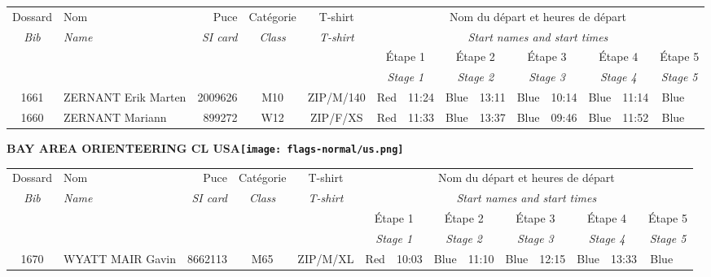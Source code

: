 \documentclass{report}
\begin{document}
  \begin{longtable}{|c|l|r|c|c|*{5}{cc|}}
    Dossard & Nom  & Puce    & Catégorie & T-shirt & \multicolumn{10}{c|}{Nom du départ et heures de départ} \\
    \itshape Bib     & \itshape Name & \itshape SI card & \itshape Class  & \itshape  T-shirt  & \multicolumn{10}{c|}{\itshape Start names and start times} \\
    \hline
    & & & & & \multicolumn{2}{c|}{Étape 1} & \multicolumn{2}{c|}{Étape 2} & \multicolumn{2}{c|}{Étape 3} & \multicolumn{2}{c|}{Étape 4} & \multicolumn{2}{c|}{Étape 5} \\
    & & & & & \multicolumn{2}{c|}{\itshape Stage 1} & \multicolumn{2}{c|}{\itshape Stage 2} & \multicolumn{2}{c|}{\itshape Stage 3} & \multicolumn{2}{c|}{\itshape Stage 4} & \multicolumn{2}{c|}{\itshape Stage 5} \\
    \hline
    1661 & ZERNANT Erik Marten & 2009626 & M10 & ZIP/M/140 & Red & 11:24 & Blue & 13:11 & Blue & 10:14 & Blue & 11:14 & Blue &  \\
    1660 & ZERNANT Mariann & 899272 & W12 & ZIP/F/XS & Red & 11:33 & Blue & 13:37 & Blue & 09:46 & Blue & 11:52 & Blue &  \\
  \end{longtable}
\newpage
  \Huge \centering \bfseries BAY AREA ORIENTEERING CL  USA\normalfont \footnotesize \sffamily \hfill \texttt{[image: flags-normal/us.png]} \newline 
  \begin{longtable}{|c|l|r|c|c|*{5}{cc|}}
    Dossard & Nom  & Puce    & Catégorie & T-shirt & \multicolumn{10}{c|}{Nom du départ et heures de départ} \\
    \itshape Bib     & \itshape Name & \itshape SI card & \itshape Class  & \itshape  T-shirt  & \multicolumn{10}{c|}{\itshape Start names and start times} \\
    \hline
    & & & & & \multicolumn{2}{c|}{Étape 1} & \multicolumn{2}{c|}{Étape 2} & \multicolumn{2}{c|}{Étape 3} & \multicolumn{2}{c|}{Étape 4} & \multicolumn{2}{c|}{Étape 5} \\
    & & & & & \multicolumn{2}{c|}{\itshape Stage 1} & \multicolumn{2}{c|}{\itshape Stage 2} & \multicolumn{2}{c|}{\itshape Stage 3} & \multicolumn{2}{c|}{\itshape Stage 4} & \multicolumn{2}{c|}{\itshape Stage 5} \\
    \hline
    1670 & WYATT MAIR Gavin & 8662113 & M65 & ZIP/M/XL & Red & 10:03 & Blue & 11:10 & Blue & 12:15 & Blue & 13:33 & Blue &  \\
  \end{longtable}
\end{document}
